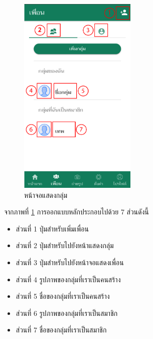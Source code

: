 		\begin{figure}[H]
			\centering
			\includegraphics[width=0.5\textwidth]{Figures/3/UI/group}
			\caption{หน้าจอแสดงกลุ่ม}
			\label{Fig:กลุ่ม}
		\end{figure}
		จากภาพที่ \ref{Fig:กลุ่ม} การออกแบบหลักประกอบไปด้วย 7 ส่วนดังนี้
		\begin{itemize}
			\item ส่วนที่ 1 ปุ่มสำหรับเพิ่มเพื่อน
			\item ส่วนที่ 2 ปุ่มสำหรับไปยังหน้าแสดงกลุ่ม
			\item ส่วนที่ 3 ปุ่มสำหรับไปยังหน้าจอแสดงเพื่อน
			\item ส่วนที่ 4 รูปภาพของกลุ่มที่เราเป็นคนสร้าง
			\item ส่วนที่ 5 ชื่อของกลุ่มที่เราเป็นคนสร้าง
			\item ส่วนที่ 6 รูปภาพของกลุ่มที่เราเป็นสมาชิก
			\item ส่วนที่ 7 ชื่อของกลุ่มที่เราเป็นสมาชิก
		\end{itemize} \\


